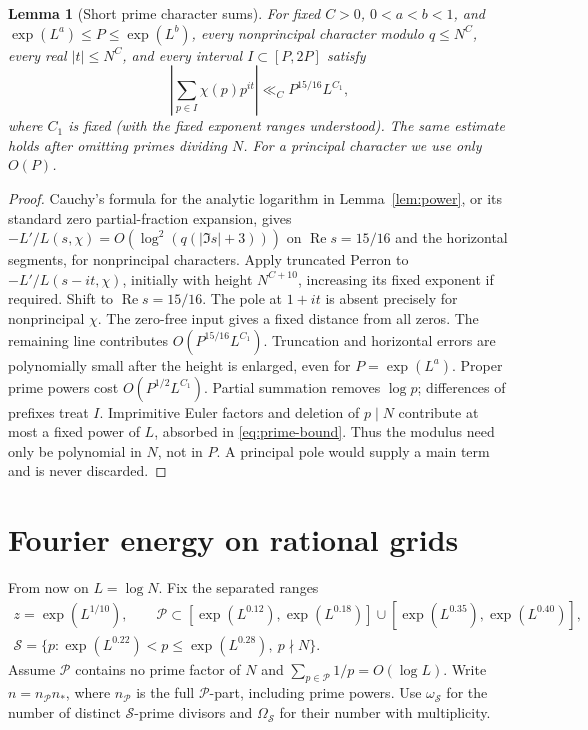 \documentclass[11pt]{article}
\newtheorem{lemma}[theorem]{Lemma}
\theoremstyle{definition}
\DeclareMathOperator{\Rea}{Re}
\newcommand{\Pset}{\mathcal P}
\newcommand{\Sset}{\mathcal S}
\theoremstyle{remark}
\begin{document}
\begin{lemma}[Short prime character sums]\label{lem:prime}
For fixed $C>0$, $0<a<b<1$, and
$\exp(L^a)\le P\le\exp(L^b)$, every nonprincipal character modulo
$q\le N^C$, every real $|t|\le N^C$, and every interval
$I\subset[P,2P]$ satisfy
\begin{equation}\label{eq:prime-bound}
\left|\sum_{p\in I}\chi(p)p^{it}\right|
\ll_C P^{15/16}L^{C_1},
\end{equation}
where $C_1$ is fixed (with the fixed exponent ranges understood).
The same estimate holds after omitting primes dividing $N$.
For a principal character we use only $O(P)$.
\end{lemma}
\begin{proof}
Cauchy's formula for the analytic logarithm in
Lemma~\ref{lem:power}, or its standard zero partial-fraction expansion,
gives $-L'/L(s,\chi)=O(\log^2(q(|\Im s|+3)))$ on
$\Rea s=15/16$ and the horizontal segments, for nonprincipal
characters. Apply truncated Perron to
$-L'/L(s-it,\chi)$, initially with height $N^{C+10}$, increasing its
fixed exponent if required. Shift to $\Rea s=15/16$.
The pole at $1+it$ is absent precisely for nonprincipal $\chi$.
The zero-free input gives a fixed distance from all zeros.
The remaining line contributes $O(P^{15/16}L^{C_1})$.
Truncation and horizontal errors are polynomially small after the
height is enlarged, even for $P=\exp(L^a)$.
Proper prime powers cost $O(P^{1/2}L^{C_1})$.
Partial summation removes $\log p$; differences of prefixes treat $I$.
Imprimitive Euler factors and deletion of $p\mid N$ contribute at
most a fixed power of $L$, absorbed in \eqref{eq:prime-bound}.
Thus the modulus need only be polynomial in $N$, not in $P$.
A principal pole would supply a main term and is never discarded.
\end{proof}

\section{Fourier energy on rational grids}\label{sec:grids}
From now on $L=\log N$. Fix the separated ranges
\begin{equation}\label{eq:separated-ranges}
\begin{gathered}
z=\exp(L^{1/10}),\qquad
\Pset\subset[\exp(L^{0.12}),\exp(L^{0.18})]
       \cup[\exp(L^{0.35}),\exp(L^{0.40})],\\
\Sset=\{p:\exp(L^{0.22})<p\le\exp(L^{0.28}),\ p\nmid N\}.
\end{gathered}
\end{equation}
Assume $\Pset$ contains no prime factor of $N$ and
$\sum_{p\in\Pset}1/p=O(\log L)$. Write $n=n_{\Pset}n_*$,
where $n_{\Pset}$ is the full $\Pset$-part, including prime powers.
Use $\omega_{\Sset}$ for the number of distinct $\Sset$-prime
divisors and $\Omega_{\Sset}$ for their number with multiplicity.
\end{document}
